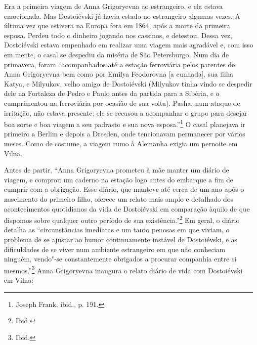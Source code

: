 Era a primeira viagem de Anna Grigoryevna ao estrangeiro, e ela estava
emocionada. Mas Dostoiévski já havia estado no estrangeiro algumas
vezes. A última vez que estivera na Europa fora em 1864, após a morte da
primeira esposa. Perdeu todo o dinheiro jogando nos cassinos, e
detestou. Dessa vez, Dostoiévski estava empenhado em realizar uma viagem
mais agradável e, com isso em mente, o casal se despediu da miséria de
São Petersburgo. Num dia de primavera, foram ``acompanhados até a
estação ferroviária pelos parentes de Anna Grigoryevna bem como por
Emilya Feodorovna {[}a cunhada{]}, sua filha Katya, e Milyukov, velho
amigo de Dostoiévski (Milyukov tinha vindo se despedir dele na Fortaleza
de Pedro e Paulo antes da partida para a Sibéria, e o cumprimentou na
ferroviária por ocasião de sua volta). Pasha, num ataque de irritação,
não estava presente; ele se recusou a acompanhar o grupo para desejar
boa sorte e boa viagem a seu padrasto e sua nova esposa.''\footnote{Joseph
  Frank, ibid., p. 191.} O casal planejava ir primeiro a Berlim e depois
a Dresden, onde tencionavam permanecer por vários meses. Como de
costume, a viagem rumo à Alemanha exigia um pernoite em Vilna.

Antes de partir, ``Anna Grigoryevna prometeu à mãe manter um diário de
viagem, e comprou um caderno na estação logo antes do embarque a fim de
cumprir com a obrigação. Esse diário, que manteve até cerca de um ano
após o nascimento do primeiro filho, oferece um relato mais amplo e
detalhado dos acontecimentos quotidianos da vida de Dostoiévski em
comparação àquilo de que dispomos sobre qualquer outro período de sua
existência.''\footnote{Ibid.} Em geral, o diário detalha as
``circunstâncias imediatas e um tanto penosas em que viviam, o problema
de se ajustar ao humor continuamente instável de Dostoiévski, e as
dificuldades de se viver num ambiente estrangeiro em que não conheciam
ninguém, vendo"-se constantemente obrigados a procurar companhia entre si
mesmos.''\footnote{Ibid.} Anna Grigoryevna inaugura o relato diário de
vida com Dostoiévski em Vilna:

